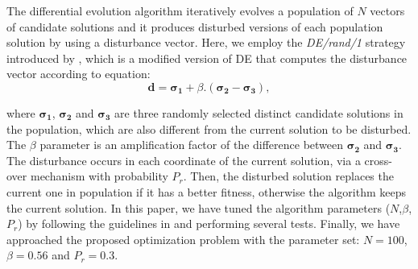 The differential evolution algorithm iteratively evolves a population of $N$ vectors of candidate solutions and it produces disturbed versions of each population solution by using a disturbance vector. Here, we employ the  \emph{DE/rand/1} strategy introduced by \cite{Storn:1996},  which is a modified version of DE that computes the disturbance vector according to equation:
\begin{equation}
\boldsymbol{d} = \boldsymbol{\sigma_1} + \beta.(\boldsymbol{\sigma_2} - \boldsymbol{\sigma_3}),
\end{equation}

\noindent where $\boldsymbol{\sigma_1}$, $\boldsymbol{\sigma_2}$ and $\boldsymbol{\sigma_3}$ are three randomly selected distinct candidate solutions in the population, which are also different from the current solution to be disturbed.  The $\beta$ parameter is an amplification factor of the difference between $\boldsymbol{\sigma_2}$ and $\boldsymbol{\sigma_3}$. The disturbance occurs in each coordinate of the current solution, via a cross-over mechanism with probability $P_r$. Then, the disturbed solution replaces the current one in population if it has a better fitness, otherwise the algorithm keeps the current solution. 
In this paper, we have tuned the algorithm parameters ($N$,$\beta$,$P_r$) by following the guidelines in \cite{Storn:1996} and performing several tests. Finally,  we have approached the proposed optimization problem with the  parameter set: $N = 100$, $\beta = 0.56$ and $P_r = 0.3$.

\begin{comment}
\begin{algorithm}[ht]
\caption{Differential evolution optimization}
\label{alg:de}
\begin{algorithmic}
\Require $N\text{,}\:M > 0$, $\:\beta\text{,}\:P_r \in (0,1]$, $\:COST$
\Ensure The best found solution that minimizes $COST$
\For{$i = 0,\:1,\:\cdots,\:N-1$}
\For{$j = 0,\:1,\:\cdots,\:M-1$}
\State $\boldsymbol{pop}[i][j] \gets U(0.125,125.0)$
\EndFor
\EndFor

\For{$j = 0,\:1,\:\cdots,\:1250$}
\For{$i = 0,\:1,\:\cdots,\:N-1$}
\State Select in $\boldsymbol{pop}$ three random distinct candidate solutions ($\boldsymbol{\sigma_a}$, $\boldsymbol{\sigma_b}$ and $\boldsymbol{\sigma_c}$) that differ from $\boldsymbol{pop}[i]$
\State $\boldsymbol{d} \gets \boldsymbol{\sigma_a} + \beta.(\boldsymbol{\sigma_b} - \boldsymbol{\sigma_c})$
\For{$k = 0,\:1,\:\cdots,\:M-1$}
\If{$\boldsymbol{d}[k] \notin [0.125,125.0]$}
\State $\boldsymbol{d}[k] \gets U(0.125,125.0)$
\EndIf
\EndFor
\State $\boldsymbol{c} \gets \boldsymbol{pop}[i]$
\State $k \gets U(0,M-1)$
\State $c[k] \gets d[k]$
\For{$k = 0,\:1,\:\cdots,\:M-1$}
\If {$U(0,1) \leq P_r$}
  \State $c[k] \gets d[k]$
\EndIf
\EndFor

\If {\Call{$COST$}{$\boldsymbol{c}$} $<$ \Call{$COST$}{$\boldsymbol{pop}[i]$}}
 \State $\boldsymbol{pop}[i] \gets \boldsymbol{c}$
\EndIf
\EndFor
\EndFor
\end{algorithmic}
\end{algorithm}
\end{comment}

